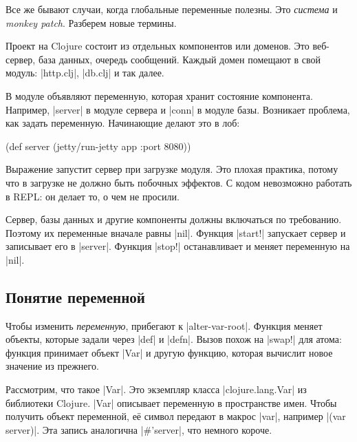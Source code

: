 Все же бывают случаи, когда глобальные переменные полезны. Это \emph{система} и
\emph{monkey patch}. Разберем новые термины.

Проект на Clojure состоит из отдельных компонентов или доменов. Это веб-сервер,
база данных, очередь сообщений. Каждый домен помещают в свой модуль:
\spverb|http.clj|, \spverb|db.clj| и так далее.

В модуле объявляют переменную, которая хранит состояние компонента. Например,
\spverb|server| в модуле сервера и \spverb|conn| в модуле базы. Возникает
проблема, как задать переменную. Начинающие делают это в лоб:

\begin{english}
  \begin{clojure}
(def server (jetty/run-jetty app {:port 8080}))
  \end{clojure}
\end{english}

Выражение запустит сервер при загрузке модуля. Это плохая практика, потому что в
загрузке не должно быть побочных эффектов. С кодом невозможно работать в REPL: он
делает то, о чем не просили.

Сервер, базы данных и другие компоненты должны включаться по требованию. Поэтому
их переменные вначале равны \spverb|nil|. Функция \spverb|start!| запускает
сервер и записывает его в \spverb|server|. Функция \spverb|stop!| останавливает
и меняет переменную на \spverb|nil|.

\subsection{Понятие переменной}


\label{var-section}

Чтобы изменить \emph{переменную}, прибегают к \spverb|alter-var-root|. Функция
меняет объекты, которые задали через \spverb|def| и \spverb|defn|. Вызов похож
на \spverb|swap!| для атома: функция принимает объект \spverb|Var| и другую
функцию, которая вычислит новое значение из прежнего.


Рассмотрим, что такое \spverb|Var|. Это экземпляр класса \spverb|clojure.lang.Var|
из библиотеки Clojure. \spverb|Var| описывает переменную в пространстве имен.
Чтобы получить объект переменной, е\"{е} символ передают в макрос \spverb|var|,
например \spverb|(var server)|. Эта запись аналогична \spverb|#'server|,
что немного короче.

